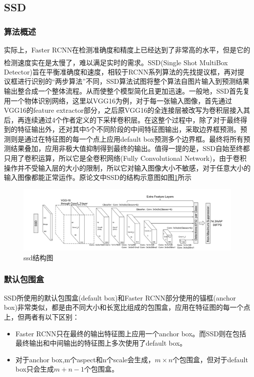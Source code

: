\documentclass[12pt,a4paper,titlepage]{article}
\newcommand{\upcite}[1]{\textsuperscript{\textsuperscript{\cite{#1}}}}  %
\begin{document}
\subsection{SSD}
\subsubsection{算法概述}
实际上，Faster RCNN在检测准确度和精度上已经达到了非常高的水平，但是它的检测速度实在是太慢了，难以满足实时的需求。SSD\upcite{liu2016ssd}(Single Shot MultiBox Detector)旨在平衡准确度和速度，相较于RCNN系列算法的先找提议框，再对提议框进行识别的“两步算法”不同，SSD算法试图将整个算法自图片输入到预测结果输出整合成一个整体流程。从而使整个模型简化且更加迅速。一般地，SSD首先复用一个物体识别网络，这里以VGG16为例，对于每一张输入图像，首先通过VGG16的feature extractor部分，之后原VGG16的全连接层被改写为卷积层接入其后，再连续通过4个作者定义的下采样卷积层。在这整个过程中，除了对于最终得到的特征输出外，还对其中5个不同阶段的中间特征图输出，采取边界框预测。预测则是通过在特征图的每一个点上应用default box预测多个边界框。最终将所有预测结果叠加，应用非极大值抑制得到最终的输出。值得一提的是，SSD自始至终都只用了卷积运算，所以它是全卷积网络(Fully Convolutional Network)，由于卷积操作并不受输入层的大小的限制，所以它对输入图像大小不敏感，对于任意大小的输入图像都能正常运作。原论文中SSD的结构示意图如图\ref{fig:ssd_pipeline}所示

\begin{figure}[h]
\centering
\includegraphics[width=16cm]{img/ssd_pipeline.png}
\caption{ssd结构图}
\label{fig:ssd_pipeline}
\end{figure}


\subsubsection{默认包围盒}
SSD所使用的默认包围盒(default box)和Faster RCNN部分使用的锚框(anchor box)非常类似，都是由不同大小和长宽比组成的包围盒，应用在特征图的每一个点上，但两者有以下区别：
\begin{itemize}
\item Faster RCNN只在最终的输出特征图上应用一个anchor box。而SSD则在包括最终输出和中间输出的特征图上多次使用了default box。
\item 对于anchor box,m个aspect和n个scale会生成，$m\times n$个包围盒，但对于default box只会生成$m+n-1$个包围盒。
\end{itemize}
\end{document}
